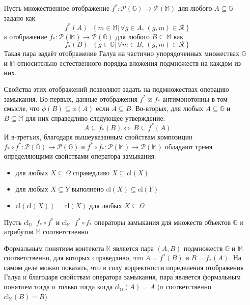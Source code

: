 \documentclass[a4paper]{article}
\newcommand{\obj}[1]{\left\{ #1 \right \}}
\newcommand{\brac}[1]{\left ( #1 \right )}
\newcommand{\induc}[1]{\left . #1 \right \vert}
\newcommand{\pwr}[1]{\mathcal{P}\brac{#1}}
\newcommand{\defn}{\mathop{\overset{\Delta}{=}}\nolimits}
\begin{document}
Пусть множественное отображение $f^*:\pwr{\mathbb{G}}\to \pwr{\mathbb{M}}$ для любого $A\subseteq \mathbb{G}$ задано как \[f^*\brac{A}\defn \obj{\induc{ m\in \mathbb{M} }\,\forall g\in A,\,\brac{g,m}\in \mathcal{R}}\] а отображение $f_*:\pwr{\mathbb{M}}\to \pwr{\mathbb{G}}$ для любого $B\subseteq \mathbb{M}$ как \[f_*\brac{B}\defn \obj{\induc{ g\in \mathbb{G} }\,\forall m\in B,\,\brac{g,m}\in \mathcal{R}}\] Такая пара задаёт отображение Галуа на частично упорядоченных множествах $\mathbb{G}$ и $\mathbb{M}$ относительно естественного порядка вложения подмножеств на каждом из них.

Свойства этих отображений позволяют задать на подмножествах операцию замыкания. Во-первых, данные отображения $f^*$ и $f_*$ антимонотонны в том смысле, что $\phi\brac{B}\subseteq \phi\brac{A}$ если $A\subseteq B$. Во-вторых, для любых $A\subseteq \mathbb{G}$ и $B\subseteq \mathbb{M}$ для них справедливо следующее утверждение: \[A\subseteq f_*\brac{B} \Leftrightarrow\, B\subseteq f^*\brac{A}\] И в-третьих, благодаря вышеуказанным свойствам композиции $f_*\circ f^*: \pwr{\mathbb{G}}\to \pwr{\mathbb{G}}$ и $f^*\circ f_*: \pwr{\mathbb{M}}\to \pwr{\mathbb{M}}$ обладают тремя определяющими свойствами оператора замыкания: \begin{itemize}
\item для любых $X\subseteq \Omega$ справедливо $X\subseteq \text{cl}\brac{X}$
\item для любых $X\subseteq Y$ выполнено $\text{cl}\brac{X}\subseteq \text{cl}\brac{Y}$
\item $\text{cl}\brac{\text{cl}\brac{X}}=\text{cl}\brac{X}$ для любых $X\subseteq \Omega$
\end{itemize} Пусть $\text{cl}_{\mathbb{G}} \defn f_*\circ f^*$ и $\text{cl}_{\mathbb{M}} \defn f^*\circ f_*$ операторы замыкания для множеств объектов $\mathbb{G}$ и атрибутов $\mathbb{M}$ соответственно.

Формальным понятием контекста $\mathbb{K}$ является пара $(A,B)$ подмножеств $\mathbb{G}$ и $\mathbb{M}$ соответственно, для которых справедливо, что $A=f^*\brac{B}$ и $B=f_*\brac{A}$. На самом деле можно показать, что в силу корректности определения отображения Галуа и благодаря свойствам оператора замыкания, пара является формальным понятием тогда и только тогда когда $\text{cl}_{\mathbb{G}}\brac{A} = A$ (и соответственно $\text{cl}_{\mathbb{M}}\brac{B} = B$).
\end{document}
